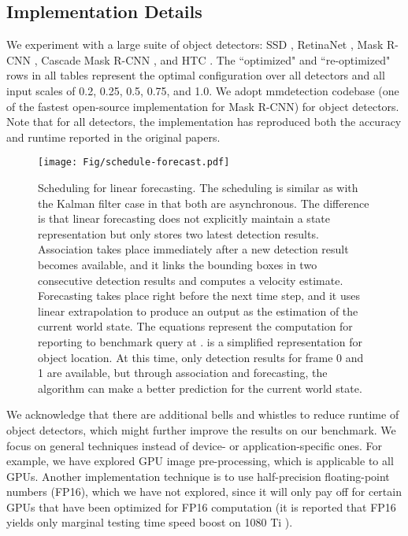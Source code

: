 \subsection{Implementation Details}

We experiment with a large suite of object detectors: SSD \cite{Liu2016SSDSS}, RetinaNet \cite{lin2017focal}, Mask R-CNN \cite{He2017MaskR}, Cascade Mask R-CNN \cite{Cai2018CascadeRD}, and HTC \cite{chen2019hybrid}. The ``optimized" and ``re-optimized" rows in all tables represent the optimal configuration over all detectors and all input scales of 0.2, 0.25, 0.5, 0.75, and 1.0. We adopt mmdetection codebase \cite{mmdetection} (one of the fastest open-source implementation for Mask R-CNN) for object detectors. Note that for all detectors, the implementation has reproduced both the accuracy and runtime reported in the original papers.

\begin{figure}[!b]
\centering
\texttt{[image: Fig/schedule-forecast.pdf]}
\caption{Scheduling for linear forecasting. The scheduling is similar as with the Kalman filter case in that both are asynchronous. The difference is that linear forecasting does not explicitly maintain a state representation but only stores two latest detection results. Association takes place immediately after a new detection result becomes available, and it links the bounding boxes in two consecutive detection results and computes a velocity estimate. Forecasting takes place right before the next time step, and it uses linear extrapolation to produce an output as the estimation of the current world state. The equations represent the computation for reporting to benchmark query at .  is a simplified representation for object location. At this time, only detection results for frame 0 and 1 are available, but through association and forecasting, the algorithm can make a better prediction for the current world state.}
\label{fig:linear-forecast}
\end{figure}

 We acknowledge that there are additional bells and whistles to reduce runtime of object detectors, which might further improve the results on our benchmark. We focus on general techniques instead of device- or application-specific ones. For example, we have explored GPU image pre-processing, which is applicable to all GPUs. Another implementation technique is to use half-precision floating-point numbers (FP16), which we have not explored, since it will only pay off for certain GPUs that have been optimized for FP16 computation (it is reported that FP16 yields only marginal testing time speed boost on 1080 Ti \cite{chen2019simpledet}).





